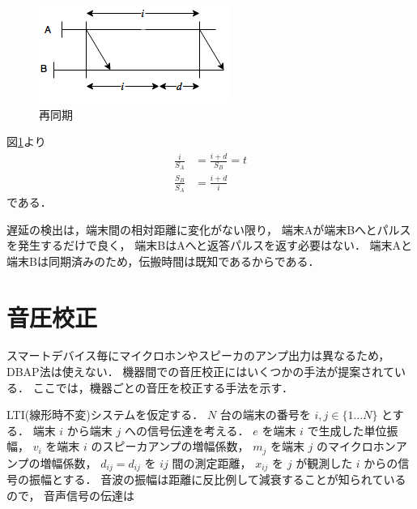 \begin{figure}[p]\centering
  \hspace{-2mm}\includegraphics[clip,width=1.1\hsize]{img/phase_shift2.png}
  \caption{再同期}\label{fig:phaseshift2}
\end{figure}

図\ref{fig:phaseshift2}より
$$\begin{aligned}
\frac{i}{S_A} &= \frac{i+d}{S_B} = t \\
\frac{S_B}{S_A} &= \frac{i+d}{i}
\end{aligned}$$
である．

遅延の検出は，端末間の相対距離に変化がない限り，
端末Aが端末Bへとパルスを発生するだけで良く，
端末BはAへと返答パルスを返す必要はない．
端末Aと端末Bは同期済みのため，伝搬時間は既知であるからである．









\section{音圧校正}
スマートデバイス毎にマイクロホンやスピーカのアンプ出力は異なるため，DBAP法は使えない．
機器間での音圧校正にはいくつかの手法が提案されている\cite{和泉洋一, 澤上佳希}．
ここでは，機器ごとの音圧を校正する手法を示す．

LTI(線形時不変)システムを仮定する．
$N$ 台の端末の番号を $i,j \in \{1\dots N\}$ とする．
端末 $i$ から端末 $j$ への信号伝達を考える．
$e$ を端末 $i$ で生成した単位振幅，
$v_i$ を端末 $i$ のスピーカアンプの増幅係数，
$m_j$ を端末 $j$ のマイクロホンアンプの増幅係数，
$d_{ij}=d_{ij}$ を $ij$ 間の測定距離，
$x_{ij}$ を $j$ が観測した $i$ からの信号の振幅とする．
音波の振幅は距離に反比例して減衰することが知られているので，
音声信号の伝達は

